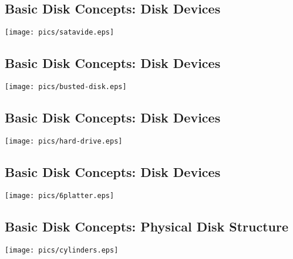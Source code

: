 \documentclass[xga]{xdvislides}
\begin{document}
\subsection{Basic Disk Concepts: Disk Devices}
\vfill
	\begin{center}
		\texttt{[image: pics/satavide.eps]} \\
	\end{center}
\vfill


\subsection{Basic Disk Concepts: Disk Devices}
	\begin{center}
		\texttt{[image: pics/busted-disk.eps]} \\
	\end{center}

\subsection{Basic Disk Concepts: Disk Devices}
\vfill
	\begin{center}
		\texttt{[image: pics/hard-drive.eps]} \\
	\end{center}
\vfill


\subsection{Basic Disk Concepts: Disk Devices}
\vfill
	\begin{center}
		\texttt{[image: pics/6platter.eps]} \\
	\end{center}
\vfill

\subsection{Basic Disk Concepts: Physical Disk Structure}
\vfill
	\begin{center}
		\texttt{[image: pics/cylinders.eps]} \\
	\end{center}
\vfill
\end{document}
